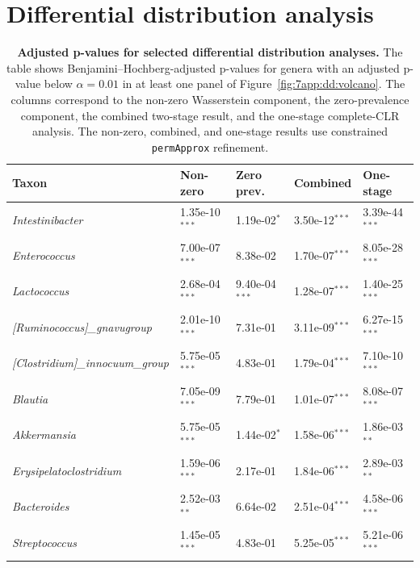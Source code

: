 \section{Differential distribution analysis}
\label{sec:app:7app:diff_distribution}

\begin{table}[H]
\centering
\caption{\textbf{Adjusted p-values for selected differential distribution analyses.} The table shows Benjamini--Hochberg-adjusted p-values for genera with an adjusted p-value below $\alpha=0.01$ in at least one panel of Figure~\ref{fig:7app:dd:volcano}. The columns correspond to the non-zero Wasserstein component, the zero-prevalence component, the combined two-stage result, and the one-stage complete-CLR analysis. The non-zero, combined, and one-stage results use constrained \texttt{permApprox} refinement.}
\label{tab:app:7app:diff_distribution_pvalues_all_approaches}
\vspace{0.5em}
\small
\begin{tabular}{lllll}
\toprule
Taxon & Non-zero & Zero prev. & Combined & One-stage \\
\midrule
\emph{Intestinibacter} & 1.35e-10$^{***}$ & 1.19e-02$^{*}$ & 3.50e-12$^{***}$ & 3.39e-44$^{***}$ \\
\emph{Enterococcus} & 7.00e-07$^{***}$ & 8.38e-02 & 1.70e-07$^{***}$ & 8.05e-28$^{***}$ \\
\emph{Lactococcus} & 2.68e-04$^{***}$ & 9.40e-04$^{***}$ & 1.28e-07$^{***}$ & 1.40e-25$^{***}$ \\
\emph{[Ruminococcus]\_gnavugroup} & 2.01e-10$^{***}$ & 7.31e-01 & 3.11e-09$^{***}$ & 6.27e-15$^{***}$ \\
\emph{[Clostridium]\_innocuum\_group} & 5.75e-05$^{***}$ & 4.83e-01 & 1.79e-04$^{***}$ & 7.10e-10$^{***}$ \\
\addlinespace
\emph{Blautia} & 7.05e-09$^{***}$ & 7.79e-01 & 1.01e-07$^{***}$ & 8.08e-07$^{***}$ \\
\emph{Akkermansia} & 5.75e-05$^{***}$ & 1.44e-02$^{*}$ & 1.58e-06$^{***}$ & 1.86e-03$^{**}$ \\
\emph{Erysipelatoclostridium} & 1.59e-06$^{***}$ & 2.17e-01 & 1.84e-06$^{***}$ & 2.89e-03$^{**}$ \\
\emph{Bacteroides} & 2.52e-03$^{**}$ & 6.64e-02 & 2.51e-04$^{***}$ & 4.58e-06$^{***}$ \\
\emph{Streptococcus} & 1.45e-05$^{***}$ & 4.83e-01 & 5.25e-05$^{***}$ & 5.21e-06$^{***}$ \\

\end{tabular}
\end{table}
